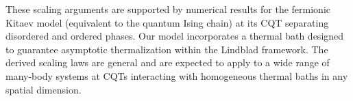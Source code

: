     These scaling arguments are supported by numerical results for the fermionic Kitaev model (equivalent to the quantum Ising chain) at its CQT separating disordered and ordered phases. Our model incorporates a thermal bath designed to guarantee asymptotic thermalization within the Lindblad framework. The derived scaling laws are general and are expected to apply to a wide range of many-body systems at CQTs interacting with homogeneous thermal baths in any spatial dimension.

